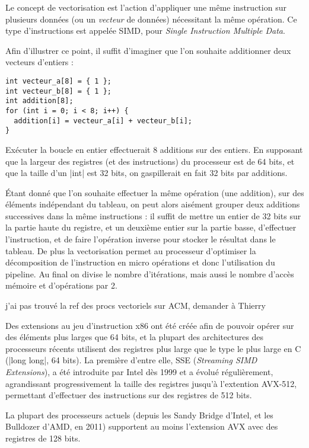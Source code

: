 Le concept de vectorisation est l'action d'appliquer une même instruction sur plusieurs données (ou un \emph{vecteur} de données) nécessitant la même opération.
Ce type d'instructions est appelée SIMD, pour \emph{Single Instruction Multiple Data}.

Afin d'illustrer ce point, il suffit d'imaginer que l'on souhaite additionner deux vecteurs d'entiers :
\begin{lstlisting}
int vecteur_a[8] = { 1 };
int vecteur_b[8] = { 1 };
int addition[8];
for (int i = 0; i < 8; i++) {
  addition[i] = vecteur_a[i] + vecteur_b[i];
}
\end{lstlisting}

Exécuter la boucle en entier effectuerait 8 additions sur des entiers.
En supposant que la largeur des registres (et des instructions) du processeur est de 64 bits, et que la taille d'un |int| est 32 bits, on gaspillerait en fait 32 bits par additions.

Étant donné que l'on souhaite effectuer la même opération (une addition), sur des éléments indépendant du tableau, on peut alors aisément grouper deux additions successives dans la même instructions : il suffit de mettre un entier de 32 bits sur la partie haute du registre, et un deuxième entier sur la partie basse, d'effectuer l'instruction, et de faire l'opération inverse pour stocker le résultat dans le tableau.
De plus la vectorisation permet au processeur d'optimiser la décomposition de l'instruction en micro opérations et donc l'utilisation du pipeline.
Au final on divise le nombre d'itérations, mais aussi le nombre d'accès mémoire et d'opérations par 2.

\begin{todo}
  j'ai pas trouvé la ref des procs vectoriels sur ACM, demander à Thierry
\end{todo}

Des extensions au jeu d'instruction x86 ont été créée afin de pouvoir opérer sur des éléments plus larges que 64 bits, et la plupart des architectures des processeurs récents utilisent des registres plus large que le type le plus large en C (|long long|, 64 bits).
La première d'entre elle, SSE (\emph{Streaming SIMD Extensions}), a été introduite par Intel dès 1999 et a évolué régulièrement, agrandissant progressivement la taille des registres jusqu'à l'extention AVX-512, permettant d'effectuer des instructions sur des registres de 512 bits.

La plupart des processeurs actuels (depuis les Sandy Bridge d'Intel, et les Bulldozer d'AMD, en 2011) supportent au moins l'extension AVX avec des registres de 128 bits.

